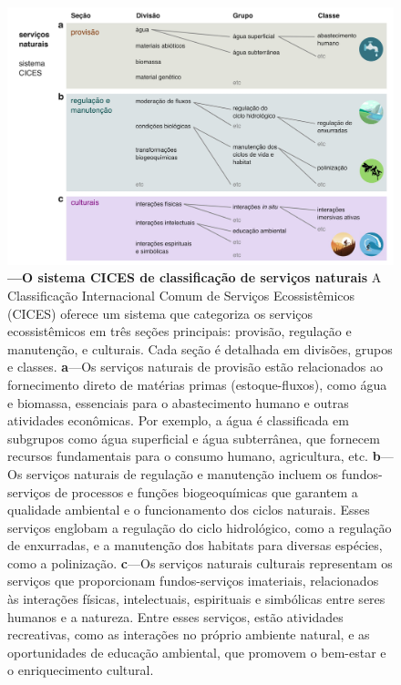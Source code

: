 \documentclass[./main.tex]{subfiles}
\begin{document}
\begin{figure}[t!] 
\centering				
\includegraphics[width=0.98\linewidth]{figs/fig_cices.jpg}		
\caption[O sistema CICES de classificação de serviços naturais]
{\textbf{---\;O sistema CICES de classificação de serviços naturais}
    A Classificação Internacional Comum de Serviços Ecossistêmicos (CICES) oferece um sistema que categoriza os serviços ecossistêmicos em três seções principais: provisão, regulação e manutenção, e culturais. Cada seção é detalhada em divisões, grupos e classes.
    \;\textbf{a}\;---\;Os serviços naturais de provisão estão relacionados ao fornecimento direto de matérias primas (estoque-fluxos), como água e biomassa, essenciais para o abastecimento humano e outras atividades econômicas. Por exemplo, a água é classificada em subgrupos como água superficial e água subterrânea, que fornecem recursos fundamentais para o consumo humano, agricultura, etc.
    \;\textbf{b}\;---\;Os serviços naturais de regulação e manutenção incluem os fundos-serviços de processos e funções biogeoquímicas que garantem a qualidade ambiental e o funcionamento dos ciclos naturais. Esses serviços englobam a regulação do ciclo hidrológico, como a regulação de enxurradas, e a manutenção dos habitats para diversas espécies, como a polinização.
    \;\textbf{c}\;---\;Os serviços naturais culturais representam os serviços que proporcionam fundos-serviços imateriais, relacionados às interações físicas, intelectuais, espirituais e simbólicas entre seres humanos e a natureza. Entre esses serviços, estão atividades recreativas, como as interações no próprio ambiente natural, e as oportunidades de educação ambiental, que promovem o bem-estar e o enriquecimento cultural.
}
\label{fig:eco:natserv:cices} 		
\end{figure}
\end{document}
